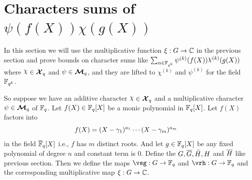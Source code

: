 \section{Characters sums of \texorpdfstring{$\psi(f(X))\chi(g(X))$}{Ψ(f(X))χ(g(X))}}\label{sec:character-sums-psif-chig}
In this section we will use the multiplicative function $\xi:G\to \mathbb{C}$ in the previous section and prove bounds on character sums like $\sum_{\alpha\in\bbF_{q^k}}\psi^{(k)}(f(X))\chi^{(k)}(g(X))$ where $\chi\in\Xq$ and $\psi\in\boldsymbol{\mathcal{M}}_q$, and they are lifted to $\chi^{(k)}$ and $\psi^{(k)}$ for the field $\mathbb{F}_{q^k}$. 

So suppose we have an additive character $\chi\in\Xq$ and a multiplicative character $\psi\in\boldsymbol{\mathcal{M}}_q$ of $\mathbb{F}_q$. Let $f(X)\in\mathbb{F}_q[X]$ be a monic polynomial in $\mathbb{F}_q[X]$. Let $f(X)$ factors into $$f(X)=(X-\gamma_1)^{a_1}\cdots (X-\gamma_m)^{a_m}$$ in the field $\overline{\mathbb{F}}_q[X]$ i.e., $f$ has $m$ distinct roots. And let $g\in\mathbb{F}_q[X]$ be any fixed polynomial of degree $n$ and constant term is $0$. Define the $G, \overline{G}, \tilde{H}, H$ and $\overline{H}$ like previous section. Then we define the maps $\vsg:G\to \bbF_q$ and $\vrh:G\to\bbF_q$ and the corresponding multiplicative map $\xi:G\to\mathbb{C}$.
